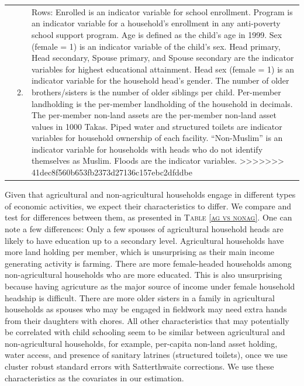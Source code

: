 \documentclass[12pt,letterpaper]{article}
\newcommand{\0}{\ensuremath{\mbox{\boldmath $0$}}}
\begin{document}
\begin{table}
\begin{minipage}[t]{.7\paperwidth}
\begin{tabular}{
>{\hfill\scriptsize}p{1cm}<{}
>{\hfill\scriptsize}p{.25cm}<{}
>{\scriptsize}p{.6\paperwidth}<{\hfill}}
& 2. & Rows: Enrolled is an indicator variable for school enrollment. Program is an indicator variable for a household's enrollment in any anti-poverty school support program. Age is defined as the child's age in 1999. Sex (female = 1) is an indicator variable of the child's sex. Head primary, Head secondary, Spouse primary, and Spouse secondary are the indicator variables for highest educational attainment. Head sex (female = 1) is an indicator variable for the household head's gender. The number of older brothers/sisters is the number of older siblings per child. Per-member landholding is the per-member landholding of the household in decimals. The per-member non-land assets are the per-member non-land asset values in 1000 Takas. Piped water and structured toilets are indicator variables for household ownership of each facility. ``Non-Muslim'' is an indicator variable for households with heads who do not identify themselves as Muslim. Floods are the indicator variables.  \setlength{\baselineskip}{8pt}
>>>>>>> 41dec8f560b653fb2373d27136c157ebc2dfddbe
\end{tabular}
\end{minipage}
\end{table}

Given that agricultural and non-agricultural households engage in different types of economic activities, we expect their characteristics to differ. We compare and test for differences between them, as presented in \textsc{\small Table \ref{ag vs nonag}}. One can note a few differences: Only a few spouses of agricultural household heads are likely to have education up to a secondary level. Agricultural households have more land holding per member, which is unsurprising as their main income generating activity is farming. There are more female-headed households among non-agricultural households who are more educated. This is also unsurprising because having agricuture as the major source of income under female household headship is difficult. There are more older sisters in a family in agricultural households as spouses who may be engaged in fieldwork may need extra hands from their daughters with chores. All other characteristics that may potentially be correlated with child schooling seem to be similar between agricultural and non-agricultural households, for example, per-capita non-land asset holding, water access, and presence of sanitary latrines (structured toilets), once we use cluster robust standard errors with Satterthwaite corrections. We use these characteristics as the covariates in our estimation. 
\end{document}
